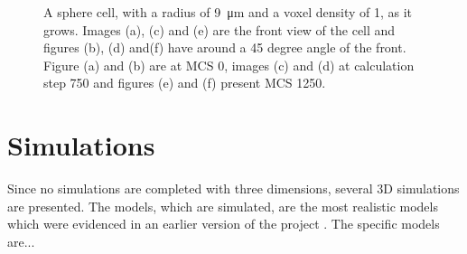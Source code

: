 \begin{figure}
\begin{center}
{	}
	\end{center}
	\begin{center}
	\end{center}
	\caption{\label{img:GrowthSphereCellRadius9}A sphere cell, with a radius of \SI{9}{\micro\metre} and a voxel density of 1, as it grows. Images (a), (c) and (e) are the front view of the cell and figures (b), (d) and(f) have around a 45 degree angle of the front. Figure (a) and (b) are at \ac{MCS} 0, images (c) and (d) at calculation step 750 and figures (e) and (f) present \ac{MCS} 1250.}
\end{figure}

\section{Simulations}
Since no simulations are completed with three dimensions, several 3D simulations are presented. The models, which are simulated, are the most realistic models which were evidenced in an earlier version of the project \cite{Torelli2017}. The specific models are...